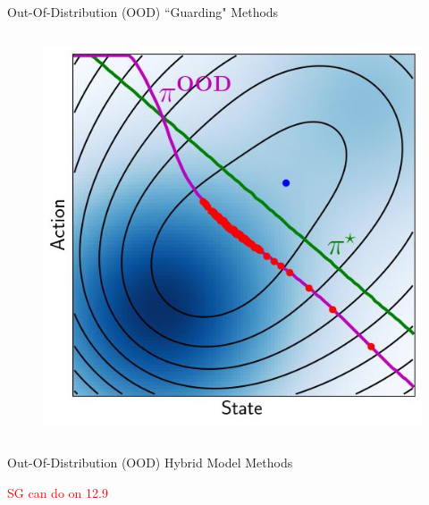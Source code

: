 \documentclass[lecture]{beamer}
\begin{document}
\begin{frame}{\normalsize Out-Of-Distribution (OOD) ``Guarding" Methods}
\begin{columns}[t]
\begin{overlayarea}{\textwidth}{0.5\textheight}
\begin{figure}
{        }
        {%
         \includegraphics[width=\FS\textwidth,clip]{Codes/Epistemic/OOD_OOD.jpeg}
        }
        \end{figure}
        \end{overlayarea}
\end{columns}

     
       \end{frame}

\begin{frame}{\normalsize Out-Of-Distribution (OOD) Hybrid Model Methods}
\footnotesize

\textcolor{red}{SG can do on 12.9}

       \end{frame}
       
       
\end{document}

